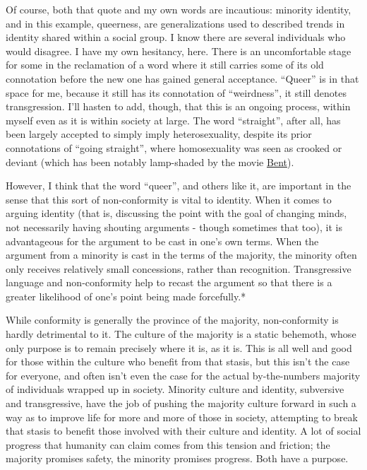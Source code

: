 Of course, both that quote and my own words are incautious: minority
identity, and in this example, queerness, are generalizations used to
described trends in identity shared within a social group. I know there
are several individuals who would disagree. I have my own hesitancy,
here. There is an uncomfortable stage for some in the reclamation of a
word where it still carries some of its old connotation before the new
one has gained general acceptance. ``Queer'' is in that space for me,
because it still has its connotation of ``weirdness'', it still denotes
transgression. I'll hasten to add, though, that this is an ongoing
process, within myself even as it is within society at large. The word
``straight'', after all, has been largely accepted to simply imply
heterosexuality, despite its prior connotations of ``going straight'',
where homosexuality was seen as crooked or deviant (which has been
notably lamp-shaded by the movie
\href{http://en.wikipedia.org/wiki/Bent_(film)}{Bent}).

However, I think that the word ``queer'', and others like it, are
important in the sense that this sort of non-conformity is vital to
identity. When it comes to arguing identity (that is, discussing the
point with the goal of changing minds, not necessarily having shouting
arguments - though sometimes that too), it is advantageous for the
argument to be cast in one's own terms. When the argument from a
minority is cast in the terms of the majority, the minority often only
receives relatively small concessions, rather than recognition.
Transgressive language and non-conformity help to recast the argument so
that there is a greater likelihood of one's point being made
forcefully.*

While conformity is generally the province of the majority,
non-conformity is hardly detrimental to it. The culture of the majority
is a static behemoth, whose only purpose is to remain precisely where it
is, as it is. This is all well and good for those within the culture who
benefit from that stasis, but this isn't the case for everyone, and
often isn't even the case for the actual by-the-numbers majority of
individuals wrapped up in society. Minority culture and identity,
subversive and transgressive, have the job of pushing the majority
culture forward in such a way as to improve life for more and more of
those in society, attempting to break that stasis to benefit those
involved with their culture and identity. A lot of social progress that
humanity can claim comes from this tension and friction; the majority
promises safety, the minority promises progress. Both have a purpose.

